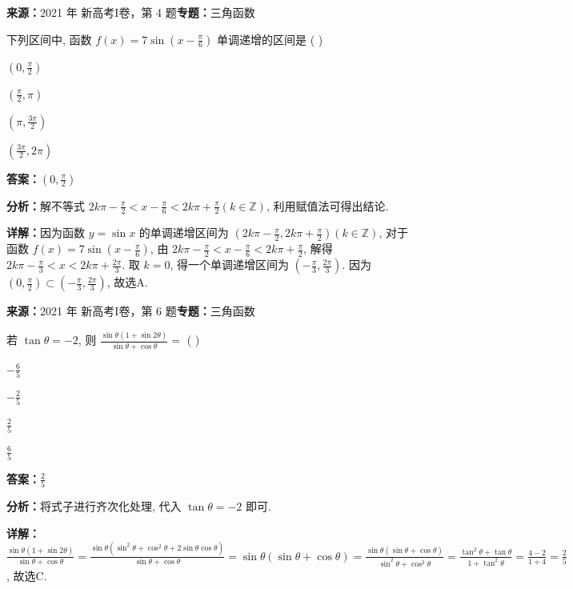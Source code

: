 \begin{question}[points=5]
\textbf{来源：}2021 年 新高考I卷，第 4 题\quad \textbf{专题：}三角函数\par
下列区间中, 函数 $f(x) = 7\sin\left(x - \frac{\pi}{6}\right)$ 单调递增的区间是 ( )
\begin{choices}
  \item $\left(0, \frac{\pi}{2}\right)$
  \item $\left(\frac{\pi}{2}, \pi\right)$
  \item $\left(\pi, \frac{3\pi}{2}\right)$
  \item $\left(\frac{3\pi}{2}, 2\pi\right)$
\end{choices}
\begin{solution}
\textbf{答案：}$\left(0, \frac{\pi}{2}\right)$

\textbf{分析：}解不等式 $2k\pi - \frac{\pi}{2} < x - \frac{\pi}{6} < 2k\pi + \frac{\pi}{2} (k \in \mathbb{Z})$, 利用赋值法可得出结论.

\textbf{详解：}因为函数 $y = \sin x$ 的单调递增区间为 $\left(2k\pi - \frac{\pi}{2}, 2k\pi + \frac{\pi}{2}\right) (k \in \mathbb{Z})$, 对于函数 $f(x) = 7\sin\left(x - \frac{\pi}{6}\right)$, 由 $2k\pi - \frac{\pi}{2} < x - \frac{\pi}{6} < 2k\pi + \frac{\pi}{2}$, 解得 $2k\pi - \frac{\pi}{3} < x < 2k\pi + \frac{2\pi}{3}$. 取 $k=0$, 得一个单调递增区间为 $\left(-\frac{\pi}{3}, \frac{2\pi}{3}\right)$. 因为 $\left(0, \frac{\pi}{2}\right) \subset \left(-\frac{\pi}{3}, \frac{2\pi}{3}\right)$, 故选A.
\end{solution}
\end{question}

\begin{question}[points=5]
\textbf{来源：}2021 年 新高考I卷，第 6 题\quad \textbf{专题：}三角函数\par
若 $\tan\theta = -2$, 则 $\frac{\sin\theta(1 + \sin2\theta)}{\sin\theta + \cos\theta} =$ ( )
\begin{choices}
  \item $-\frac{6}{5}$
  \item $-\frac{2}{5}$
  \item $\frac{2}{5}$
  \item $\frac{6}{5}$
\end{choices}
\begin{solution}
\textbf{答案：}$\frac{2}{5}$

\textbf{分析：}将式子进行齐次化处理, 代入 $\tan\theta = -2$ 即可.

\textbf{详解：}$\frac{\sin\theta(1 + \sin2\theta)}{\sin\theta + \cos\theta} = \frac{\sin\theta(\sin^2\theta + \cos^2\theta + 2\sin\theta\cos\theta)}{\sin\theta + \cos\theta} = \sin\theta(\sin\theta + \cos\theta) = \frac{\sin\theta(\sin\theta + \cos\theta)}{\sin^2\theta + \cos^2\theta} = \frac{\tan^2\theta + \tan\theta}{1 + \tan^2\theta} = \frac{4 - 2}{1 + 4} = \frac{2}{5}$, 故选C.
\end{solution}
\end{question}


